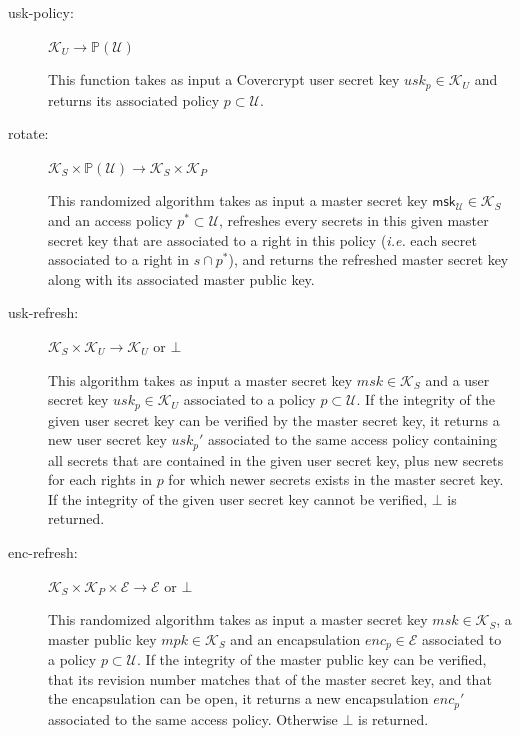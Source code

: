 \documentclass[a4paper]{article}
\theoremstyle{definition}
\newcommand{\msk}[1]{\mathsf{msk}_{#1}}
\newcommand{\powerset}[1]{\mathbb P(#1)}
\newcommand{\cE}{\mathcal{E}}
\newcommand{\cK}{\mathcal{K}}
\newcommand{\cU}{\mathcal{U}}
\begin{document}
\begin{description}
\item[{usk-policy:}] \(\cK_U \rightarrow \powerset{\cU}\)

This function  takes as input a  Covercrypt user secret key  \(usk_p \in \cK_U\)
and returns its associated policy \(p \subset \cU\).

\item[{rotate:}] \(\cK_S \times \powerset{\cU} \rightarrow \cK_S \times \cK_P\)

This randomized  algorithm takes as input  a master secret key  \(\msk{\cU} \in
  \cK_S\) and an access policy \(p^* \subset \cU\), refreshes every secrets in this
given master secret key that are associated  to a right in this policy (\emph{i.e.}
each secret associated to a right in  \(s \cap p^*\)), and returns the refreshed
master secret key along with its associated master public key.

\item[{usk-refresh:}] \(\cK_S \times \cK_U \rightarrow \cK_U\) or \(\bot\)

This algorithm takes as  input a master secret key \(msk \in  \cK_S\) and a user
secret key \(usk_p  \in \cK_U\) associated to  a policy \(p \subset  \cU\). If the
integrity of the  given user secret key  can be verified by  the master secret
key, it returns a  new user secret key \(usk_p'\) associated  to the same access
policy containing all secrets that are contained in the given user secret key,
plus new secrets for each rights in  \(p\) for which newer secrets exists in the
master secret key.   If the integrity of  the given user secret  key cannot be
verified, \(\bot\) is returned.

\item[{enc-refresh:}] \(\cK_S \times \cK_P \times \cE \rightarrow \cE\) or \(\bot\)

This randomized algorithm takes as input  a master secret key \(msk \in \cK_S\),
a  master public  key \(mpk  \in \cK_S\)  and an  encapsulation \(enc_p  \in \cE\)
associated to a policy \(p \subset \cU\).  If the integrity of the master public
key  can be  verified, that  its revision  number matches  that of  the master
secret  key,  and  that the  encapsulation  can  be  open,  it returns  a  new
encapsulation \(enc_p'\) associated to the  same access policy. Otherwise \(\bot\)
is returned.
\end{description}

\end{document}
